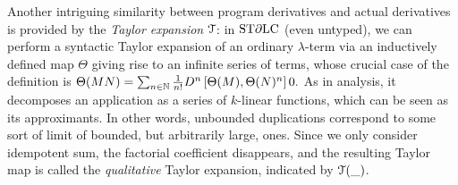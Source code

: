 Another intriguing similarity between program derivatives and 
actual derivatives is provided by the \emph{Taylor expansion} $\mathcal{T}$:
in $\mathrm{ST}\partial\mathrm{LC}$ (even untyped), we can perform a syntactic Taylor expansion of an ordinary $\lambda$-term via an inductively defined map $\Theta$ giving rise to an infinite series of terms, whose crucial case of the definition is
$
\Theta(MN)=\sum_{n\in\mathbb{N}}\frac{1}{n!}\Der^n\left[\Theta(M),\Theta(N)^n\right]0.
$
As in analysis, it decomposes an application as a series of $k$-linear functions, which can be seen as its approximants.
In other words, unbounded duplications correspond to some sort of limit of bounded, but arbitrarily large, ones.
Since we only consider idempotent sum, the factorial coefficient disappears, and the resulting Taylor map is called the \emph{qualitative} Taylor expansion, indicated by $\mathcal{T}(\_)$.

%
%

